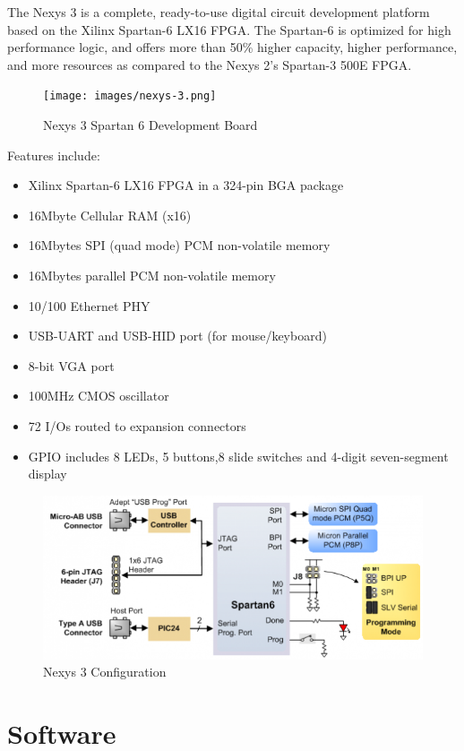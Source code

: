 The Nexys 3 is a complete, ready-to-use digital circuit development platform based on the Xilinx Spartan-6 LX16 FPGA. The Spartan-6 is optimized for high performance logic, and offers more than 50\% higher capacity, higher performance, and more resources as compared to the Nexys 2's Spartan-3 500E FPGA.

\begin{figure}
	\centering
	\texttt{[image: images/nexys-3.png]}
	\caption{Nexys 3 Spartan 6 Development Board}
\end{figure}

Features include:

\begin{itemize}
\item Xilinx Spartan-6 LX16 FPGA in a 324-pin BGA package
\item 16Mbyte Cellular RAM (x16)
\item 16Mbytes SPI (quad mode) PCM non-volatile memory
\item 16Mbytes parallel PCM non-volatile memory
\item 10/100 Ethernet PHY
\item USB-UART and USB-HID port (for mouse/keyboard)
\item 8-bit VGA port
\item 100MHz CMOS oscillator
\item 72 I/Os routed to expansion connectors
\item GPIO includes 8 LEDs, 5 buttons,8 slide switches and 4-digit seven-segment display
\end{itemize}

\begin{figure}
	\centering
	\includegraphics[scale=0.7]{images/nexys-3-config.png}
	\caption{Nexys 3 Configuration }
\end{figure}

\section{Software}

